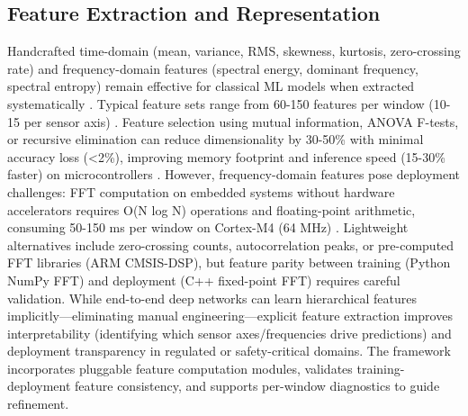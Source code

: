 \subsection{Feature Extraction and Representation}
Handcrafted time-domain (mean, variance, RMS, skewness, kurtosis, zero-crossing rate) and frequency-domain features (spectral energy, dominant frequency, spectral entropy) remain effective for classical ML models when extracted systematically \cite{oppenheim1999discrete}. Typical feature sets range from 60-150 features per window (10-15 per sensor axis) \cite{wang2024har_comparative}. Feature selection using mutual information, ANOVA F-tests, or recursive elimination can reduce dimensionality by 30-50\% with minimal accuracy loss (<2\%), improving memory footprint and inference speed (15-30\% faster) on microcontrollers \cite{banos2014wisdm}. However, frequency-domain features pose deployment challenges: FFT computation on embedded systems without hardware accelerators requires O(N log N) operations and floating-point arithmetic, consuming 50-150 ms per window on Cortex-M4 (64 MHz) \cite{banbury2021mlperf}. Lightweight alternatives include zero-crossing counts, autocorrelation peaks, or pre-computed FFT libraries (ARM CMSIS-DSP), but feature parity between training (Python NumPy FFT) and deployment (C++ fixed-point FFT) requires careful validation. While end-to-end deep networks can learn hierarchical features implicitly---eliminating manual engineering---explicit feature extraction improves interpretability (identifying which sensor axes/frequencies drive predictions) and deployment transparency in regulated or safety-critical domains. The framework incorporates pluggable feature computation modules, validates training-deployment feature consistency, and supports per-window diagnostics to guide refinement.

